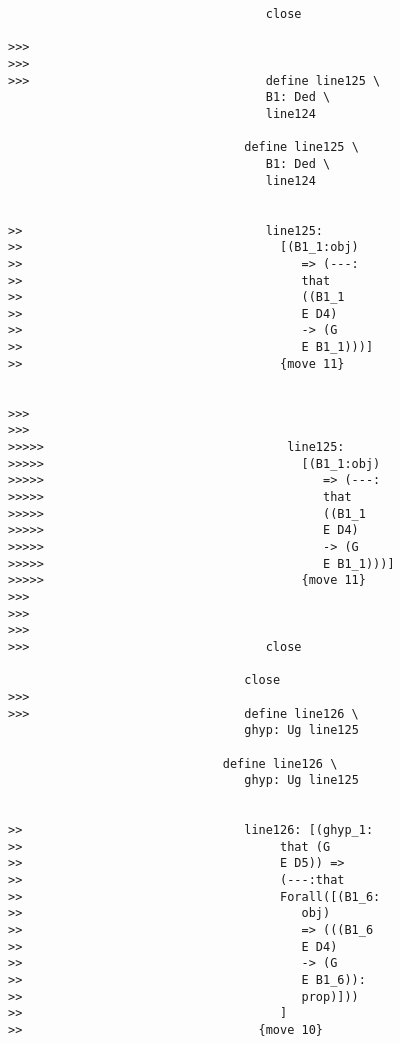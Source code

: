 \documentclass[12pt]{article}
\begin{document}
\begin{verbatim}
                                    close

>>>
>>>
>>>                                 define line125 \
                                    B1: Ded \
                                    line124

                                 define line125 \
                                    B1: Ded \
                                    line124


>>                                  line125:
>>                                    [(B1_1:obj)
>>                                       => (---:
>>                                       that
>>                                       ((B1_1
>>                                       E D4)
>>                                       -> (G
>>                                       E B1_1)))]
>>                                    {move 11}


>>>
>>>
>>>>>                                  line125:
>>>>>                                    [(B1_1:obj)
>>>>>                                       => (---:
>>>>>                                       that
>>>>>                                       ((B1_1
>>>>>                                       E D4)
>>>>>                                       -> (G
>>>>>                                       E B1_1)))]
>>>>>                                    {move 11}
>>>
>>>
>>>
>>>                                 close

                                 close
>>>
>>>                              define line126 \
                                 ghyp: Ug line125

                              define line126 \
                                 ghyp: Ug line125


>>                               line126: [(ghyp_1:
>>                                    that (G
>>                                    E D5)) =>
>>                                    (---:that
>>                                    Forall([(B1_6:
>>                                       obj)
>>                                       => (((B1_6
>>                                       E D4)
>>                                       -> (G
>>                                       E B1_6)):
>>                                       prop)]))
>>                                    ]
>>                                 {move 10}



\end{verbatim}
\end{document}
